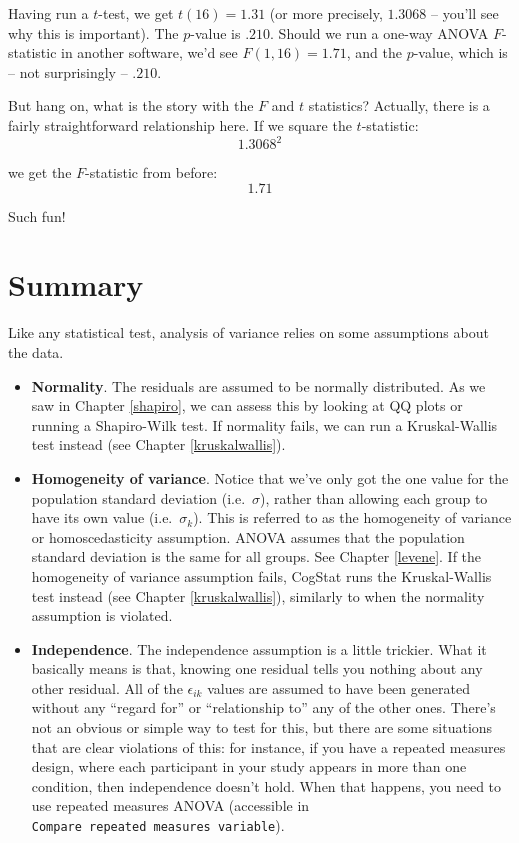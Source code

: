\documentclass[
  11pt,
  a4paper,
  twoside,symmetric,openright]{book}
\providecommand{\tightlist}{%
  \setlength{\itemsep}{0pt}\setlength{\parskip}{0pt}}
\theoremstyle{break}
\theoremstyle{break}
\begin{document}
Having run a \(t\)-test, we get \(t(16) = 1.31\) (or more precisely, \(1.3068\) -- you'll see why this is important). The \(p\)-value is \(.210\). Should we run a one-way ANOVA \(F\)-statistic in another software, we'd see \(F(1,16) = 1.71\), and the \(p\)-value, which is -- not surprisingly -- \(.210\).

But hang on, what is the story with the \(F\) and \(t\) statistics? Actually, there is a fairly straightforward relationship here. If we square the \(t\)-statistic:
\[
1.3068 ^ 2
\]

we get the \(F\)-statistic from before:
\[
1.71
\]

Such fun!

\section{Summary}\label{summary-8}

Like any statistical test, analysis of variance relies on some assumptions about the data.

\begin{itemize}
\tightlist
\item
  \textbf{Normality}. The residuals are assumed to be normally distributed. As we saw in Chapter \ref{shapiro}, we can assess this by looking at QQ plots or running a Shapiro-Wilk test. If normality fails, we can run a Kruskal-Wallis test instead (see Chapter \ref{kruskalwallis}).
\item
  \textbf{Homogeneity of variance}. Notice that we've only got the one value for the population standard deviation (i.e.~\(\sigma\)), rather than allowing each group to have its own value (i.e.~\(\sigma_k\)). This is referred to as the homogeneity of variance or homoscedasticity assumption. ANOVA assumes that the population standard deviation is the same for all groups. See Chapter \ref{levene}. If the homogeneity of variance assumption fails, CogStat runs the Kruskal-Wallis test instead (see Chapter \ref{kruskalwallis}), similarly to when the normality assumption is violated.
\item
  \textbf{Independence}. The independence assumption is a little trickier. What it basically means is that, knowing one residual tells you nothing about any other residual. All of the \(\epsilon_{ik}\) values are assumed to have been generated without any ``regard for'' or ``relationship to'' any of the other ones. There's not an obvious or simple way to test for this, but there are some situations that are clear violations of this: for instance, if you have a repeated measures design, where each participant in your study appears in more than one condition, then independence doesn't hold. When that happens, you need to use repeated measures ANOVA (accessible in \texttt{Compare\ repeated\ measures\ variable}).
\end{itemize}
\end{document}
